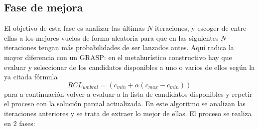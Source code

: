 \subsection{Fase de mejora}
El objetivo de esta fase es analizar las últimas $N$ iteraciones, y escoger de entre ellas a los mejores vuelos de forma aleatoria para que en las siguientes $N$ iteraciones tengan más probabilidades de ser lanzados antes. Aquí radica la mayor diferencia con un GRASP: en el metahurístico constructivo hay que evaluar y seleccionar de los candidatos disponibles a uno o varios de ellos según la ya citada fórmula
\begin{equation}
{RCL}_{umbral} = (c_{min}+\alpha(c_{max} - c_{min} ))
\end{equation}
para a continuación volver a evaluar a la lista de candidatos disponibles y repetir el proceso con la solución parcial actualizada. En este algoritmo se analizan las iteraciones anteriores y se trata de extraer lo mejor de ellas. El proceso se realiza en 2 fases: 
